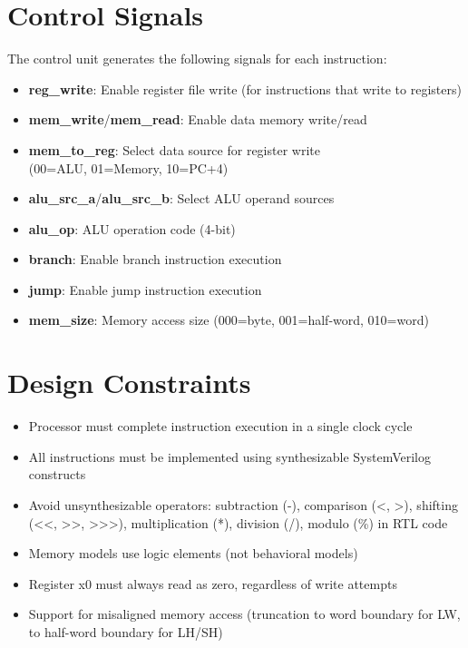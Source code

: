 \section{Control Signals}

The control unit generates the following signals for each instruction:

\begin{itemize}
    \item \textbf{reg\_write}: Enable register file write (for instructions that write to registers)
    \item \textbf{mem\_write}/\textbf{mem\_read}: Enable data memory write/read
    \item \textbf{mem\_to\_reg}: Select data source for register write\\ (00=ALU, 01=Memory, 10=PC+4)
    \item \textbf{alu\_src\_a}/\textbf{alu\_src\_b}: Select ALU operand sources
    \item \textbf{alu\_op}: ALU operation code (4-bit)
    \item \textbf{branch}: Enable branch instruction execution
    \item \textbf{jump}: Enable jump instruction execution
    \item \textbf{mem\_size}: Memory access size (000=byte, 001=half-word, 010=word)
\end{itemize}

\section{Design Constraints}

\begin{itemize}
    \item Processor must complete instruction execution in a single clock cycle
    \item All instructions must be implemented using synthesizable SystemVerilog constructs
    \item Avoid unsynthesizable operators: subtraction (-), comparison (<, >), shifting (<<, >>, >>>), multiplication (*), division (/), modulo (\%) in RTL code
    \item Memory models use logic elements (not behavioral models)
    \item Register x0 must always read as zero, regardless of write attempts
    \item Support for misaligned memory access (truncation to word boundary for LW, to half-word boundary for LH/SH)
\end{itemize}

